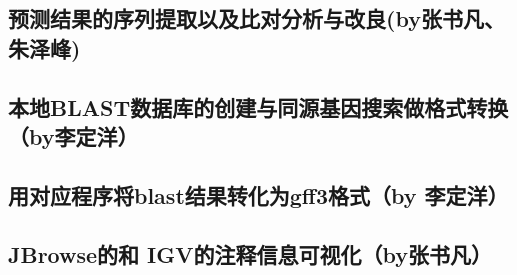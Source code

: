 \documentclass[12pt]{ctexart}
\begin{document}
\subsection{预测结果的序列提取以及比对分析与改良(by张书凡、朱泽峰)}



\subsection{本地BLAST数据库的创建与同源基因搜索做格式转换（by李定洋）}



\subsection{用对应程序将blast结果转化为gff3格式（by 李定洋）}



\subsection{JBrowse的和 IGV的注释信息可视化（by张书凡）}

\newpage



\end{document}
